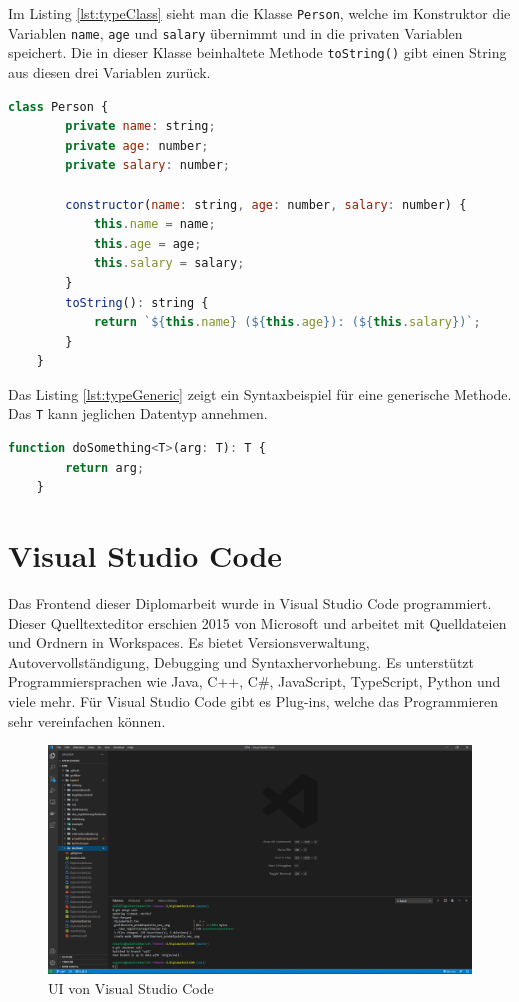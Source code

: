 Im Listing \ref{lst:typeClass} sieht man die Klasse \texttt{Person}, welche im Konstruktor die Variablen \texttt{name}, \texttt{age} und \texttt{salary} übernimmt und in die privaten Variablen speichert. Die in dieser Klasse beinhaltete Methode \texttt{toString()} gibt einen String aus diesen drei Variablen zurück.
\begin{lstlisting}[caption={TypeScript-Beispiel Klasse},captionpos=b, language=JavaScript, label={lst:typeClass}]
	class Person {
		private name: string;
		private age: number;
		private salary: number;
		
		constructor(name: string, age: number, salary: number) {
			this.name = name;
			this.age = age;
			this.salary = salary;
		}
		toString(): string {
			return `${this.name} (${this.age}): (${this.salary})`;
		}
	}
\end{lstlisting}
Das Listing \ref{lst:typeGeneric} zeigt ein Syntaxbeispiel für eine generische Methode. Das \texttt{T} kann jeglichen Datentyp annehmen.
\begin{lstlisting}[caption={TypeScript-Beispiel Generische Programmierung}, language=JavaScript, label={lst:typeGeneric}]
	function doSomething<T>(arg: T): T {
		return arg;
	}
\end{lstlisting}

\section{Visual Studio Code}
Das Frontend dieser Diplomarbeit wurde in Visual Studio Code programmiert. Dieser Quelltexteditor erschien 2015 von Microsoft und arbeitet mit Quelldateien und Ordnern in Workspaces. Es bietet Versionsverwaltung, Autovervollständigung, Debugging und Syntaxhervorhebung. Es unterstützt Programmiersprachen wie Java, C++, C\#, JavaScript, TypeScript, Python und viele mehr. Für Visual Studio Code gibt es Plug-ins, welche das Programmieren sehr vereinfachen können. \autocite{wikiVisualStudioCode}

\begin{figure}[H]
	\centerline{
		\includegraphics[width=1\textwidth, frame]{./grafiken/vs_code_startbildschirm.PNG}
	}
	\vskip0pt
	\caption{UI von Visual Studio Code} \label{fig:visualStudioCodeStartview}
\end{figure}

